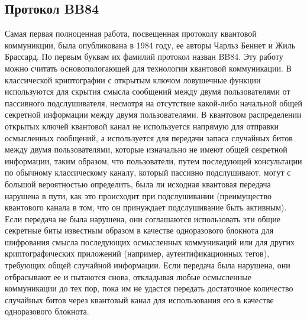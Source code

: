 \subsection{Протокол BB84}\label{sec:ch1/sect2/DVQKD prot/bb84 ch1}
Самая первая полноценная работа, посвещенная протоколу квантовой коммуникции, была опубликована в 1984 году, ее авторы Чарльз Беннет и Жиль Брассард. По первым буквам их фамилий протокол назван BB84. Эту работу можно считать основопологающей для технологии квантовой коммуникации. 
\newline В классической  криптографии с открытым ключом ловушечные функции используются для скрытия смысла сообщений между двумя пользователями от пассивного подслушивателя, несмотря на отсутствие какой-либо начальной общей секретной информации между двумя пользователями. В квантовом распределении открытых ключей квантовой канал не используется напрямую для отправки осмысленных сообщений, а используется для передачи запаса случайных битов между двумя пользователями, которые изначально не имеют общей секретной информации, таким образом, что пользователи, путем последующей консультации по обычному классическому каналу, который  пассивно подслушивают, могут с большой вероятностью определить, была ли исходная квантовая передача нарушена в пути, как это происходит при подслушивании (преимущество квантового канала в том, что он принуждает подслушивание быть активным). Если передача не была нарушена, они соглашаются использовать эти общие секретные биты известным образом в качестве одноразового блокнота для шифрования смысла последующих осмысленных коммуникаций или для других криптографических приложений (например, аутентификационных тегов), требующих общей случайной информации. Если передача была нарушена, они отбрасывают ее и пытаются снова, откладывая любые осмысленные коммуникации до тех пор, пока им не удастся передать достаточное количество случайных битов через квантовый канал для использования его в качестве одноразового блокнота.
